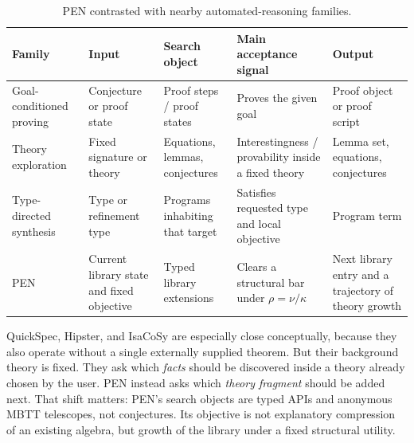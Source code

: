 \documentclass[11pt,a4paper]{article}
\begin{document}
\begin{table}[H]
\centering
\caption{PEN contrasted with nearby automated-reasoning families.}
\label{tab:system-comparison}
\small
\begin{tabular}{@{}p{2.7cm}p{3.1cm}p{3.0cm}p{2.8cm}p{3.0cm}@{}}
\toprule
Family & Input & Search object & Main acceptance signal & Output \\
\midrule
Goal-conditioned proving~\cite{alphageometry,leandojo,openai-lean} & Conjecture or proof state & Proof steps / proof states & Proves the given goal & Proof object or proof script \\
Theory exploration~\cite{quickspec,isacosy,hipster} & Fixed signature or theory & Equations, lemmas, conjectures & Interestingness / provability inside a fixed theory & Lemma set, equations, conjectures \\
Type-directed synthesis~\cite{synquid} & Type or refinement type & Programs inhabiting that target & Satisfies requested type and local objective & Program term \\
PEN & Current library state and fixed objective & Typed library extensions & Clears a structural bar under $\rho=\nu/\kappa$ & Next library entry and a trajectory of theory growth \\
\bottomrule
\end{tabular}
\end{table}

QuickSpec, Hipster, and IsaCoSy are especially close conceptually, because they also operate without a single externally supplied theorem. But their background theory is fixed. They ask which \emph{facts} should be discovered inside a theory already chosen by the user. PEN instead asks which \emph{theory fragment} should be added next. That shift matters: PEN's search objects are typed APIs and anonymous MBTT telescopes, not conjectures. Its objective is not explanatory compression of an existing algebra, but growth of the library under a fixed structural utility.
\end{document}
